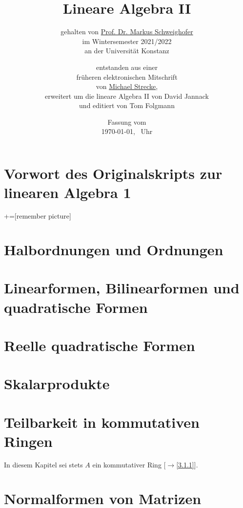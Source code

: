 \documentclass[
twoside=semi, %
fontsize=12,
DIV=12, %
cleardoublepage=current,
leqno,
headings=optiontoheadandtoc, %
toc=idx %
]{scrbook}
\theoremstyle{definition}
\DeclareMathOperator\im{im}
\begin{document}
\subject{Skript zur Vorlesung}
\title{Lineare Algebra II}
\subtitle{gehalten von \href{http://www.math.uni-konstanz.de/~schweigh/}{Prof. Dr. Markus Schweighofer}\\im Wintersemester 2021/2022\\an der Universität Konstanz}
\author{\small entstanden aus einer\\
\small früheren elektronischen Mitschrift\\
\small von \href{https://www.is.mpg.de/person/mstrecke}{Michael Strecke}, \\
\small erweitert um die lineare Algebra II von David Jannack\\
\small und editiert von Tom Folgmann}
\date{Fassung vom\\\today, \currenttime\ Uhr}
\frontmatter
\pagestyle{empty}

\maketitle

\noindent
    

\chapter*{Vorwort des Originalskripts zur linearen Algebra 1}
\pagestyle{scrheadings}
\manualmark
    

\tableofcontents

\mainmatter
{}+=[remember picture]

\chapter{Halbordnungen und Ordnungen}
    

\chapter{Linearformen, Bilinearformen und quadratische Formen}
    
    
\chapter{Reelle quadratische Formen}
    
    
\chapter{Skalarprodukte}
    

\chapter{Teilbarkeit in kommutativen Ringen}
In diesem Kapitel sei stets $A$ ein kommutativer Ring [$\to$\ref{3.1.1}].
    

\chapter{Normalformen von Matrizen}
    

\backmatter
\printindex
\end{document}
